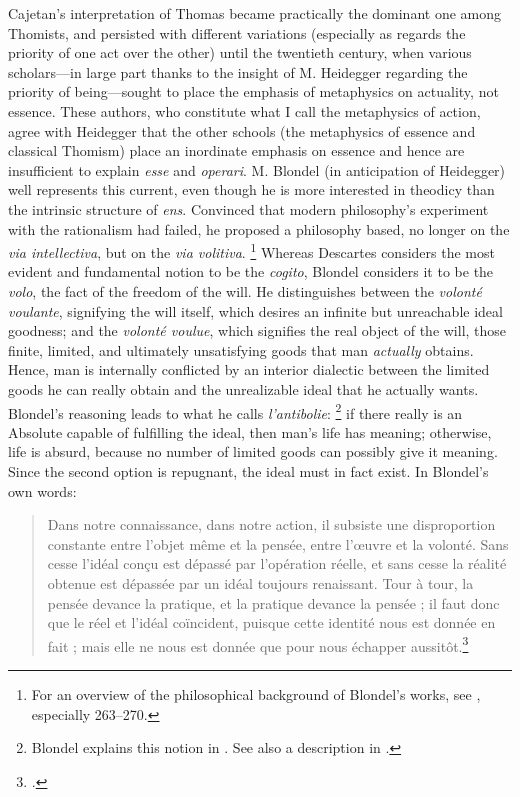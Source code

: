 Cajetan’s interpretation of Thomas became practically the dominant one among Thomists, and persisted with different variations (especially as regards the priority of one act over the other) until the twentieth century, when various scholars—in large part thanks to the insight of M. Heidegger regarding the priority of being—sought to place the emphasis of metaphysics on actuality, not essence. These authors, who constitute what I call the metaphysics of action, agree with Heidegger that the other schools (the metaphysics of essence and classical Thomism) place an inordinate emphasis on essence and hence are insufficient to explain \emph{esse} and \emph{operari}.
M. Blondel (in anticipation of Heidegger) well represents this current, even though he is more interested in theodicy than the intrinsic structure of \emph{ens}. Convinced that modern philosophy’s experiment with the rationalism had failed, he proposed a philosophy based, no longer on the \emph{via intellectiva}, but on the \emph{via volitiva}.%
%
\footnote{For an overview of the philosophical background of Blondel’s works, see \cite{nicolosi:azione}, especially 263–270.}
%
 Whereas Descartes considers the most evident and fundamental notion to be the \emph{cogito}, Blondel considers it to be the \emph{volo}, the fact of the freedom of the will. He distinguishes between the \emph{volonté voulante}, signifying the will itself, which desires an infinite but unreachable ideal goodness; and the \emph{volonté voulue}, which signifies the real object of the will, those finite, limited, and ultimately unsatisfying goods that man \emph{actually} obtains. Hence, man is internally conflicted by an interior dialectic between the limited goods he can really obtain and the unrealizable ideal that he actually wants. Blondel’s reasoning leads to what he calls \emph{l’antibolie}:%
%
\footnote{Blondel explains this notion in \cite[323–324]{blondel:action}. See also a description in \cite[274–276]{nicolosi:azione}.}
%
if there really is an Absolute capable of fulfilling the ideal, then man’s life has meaning; otherwise, life is absurd, because no number of limited goods can possibly give it meaning. Since the second option is repugnant, the ideal must in fact exist. In Blondel’s own words:
%
\begin{quotation}
Dans notre connaissance, dans notre action, il subsiste une disproportion constante
entre l’objet même et la pensée, entre l’œuvre et la volonté. Sans cesse l’idéal conçu
est dépassé par l’opération réelle, et sans cesse la réalité obtenue est dépassée par
un idéal toujours renaissant. Tour à tour, la pensée devance la pratique, et la
pratique devance la pensée ; il faut donc que le réel et l’idéal coïncident, puisque cette identité nous est donnée en fait ; mais elle ne nous est donnée que pour nous échapper aussitôt.\footcite[344–345]{blondel:action}
\end{quotation}
